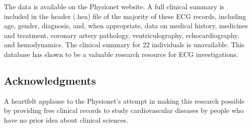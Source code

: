 The data is available on the Physionet website. A full clinical summary is included in the header (.hea) file of the majority of these ECG records, including age, gender, diagnosis, and, when appropriate, data on medical history, medicines and treatment, coronary artery pathology, ventriculography, echocardiography, and hemodynamics. The clinical summary for 22 individuals is unavailable. This database has shown to be a valuable research resource for ECG investigations.





\subsection*{Acknowledgments}

A heartfelt applause to the Physionet's attempt in making this research possible by providing free clinical records to study cardiovascular diseases by people who have no prior idea about clinical sciences. 